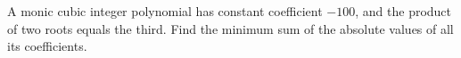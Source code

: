 A monic cubic integer polynomial has constant coefficient $-100$, and the product of two roots equals the third. Find the minimum sum of the absolute values of all its coefficients.
